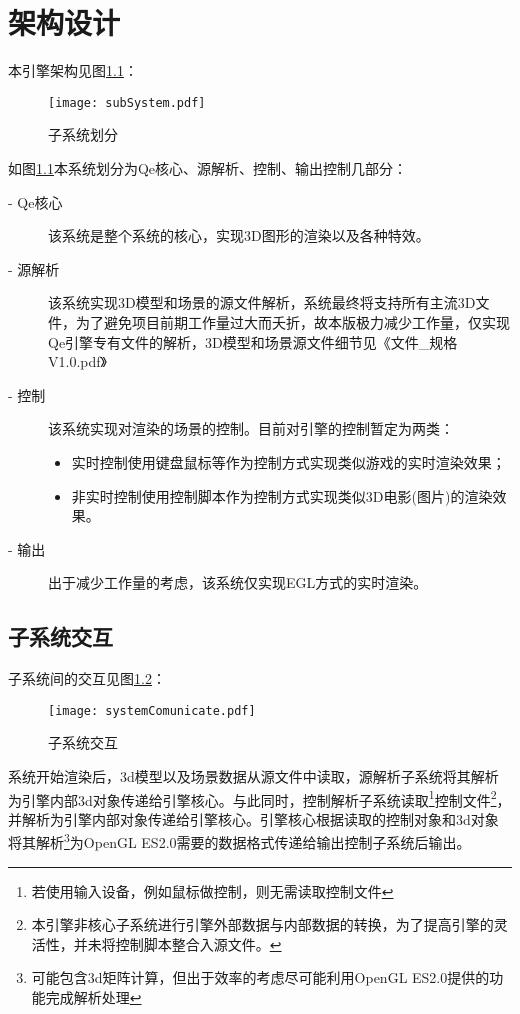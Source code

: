 \documentclass[12pt,a4paper]{report}
\begin{document}
\chapter{架构设计}
本引擎架构见图\ref{子系统划分}：

\begin{figure}[!hbp]
\begin{center}
\texttt{[image: subSystem.pdf]}
\end{center}
\caption{子系统划分\label{子系统划分}}
\end{figure}

如图\ref{子系统划分}本系统划分为Qe核心、源解析、控制、输出控制几部分：
\begin{description}
	\item[- Qe核心] 该系统是整个系统的核心，实现3D图形的渲染以及各种特效。
	\item[- 源解析] 该系统实现3D模型和场景的源文件解析，系统最终将支持所有主流3D文件，为了避免项目前期工作量过大而夭折，故本版极力减少工作量，仅实现Qe引擎专有文件的解析，3D模型和场景源文件细节见《文件\_规格V1.0.pdf》
	\item[- 控制] 该系统实现对渲染的场景的控制。目前对引擎的控制暂定为两类： 
		\begin{itemize}
			\item 实时控制使用键盘鼠标等作为控制方式实现类似游戏的实时渲染效果；
			\item 非实时控制使用控制脚本作为控制方式实现类似3D电影(图片)的渲染效果。
                \end{itemize}
	\item[- 输出] 出于减少工作量的考虑，该系统仅实现EGL方式的实时渲染。
\end{description}

\section{子系统交互}
子系统间的交互见图\ref{系统交互}：

\begin{figure}[!hbp]
\begin{center}
\texttt{[image: systemComunicate.pdf]}
\end{center}
\caption{子系统交互\label{系统交互}}
\end{figure}

系统开始渲染后，3d模型以及场景数据从源文件中读取，源解析子系统将其解析为引擎内部3d对象传递给引擎核心。与此同时，控制解析子系统读取\footnote{若使用输入设备，例如鼠标做控制，则无需读取控制文件}控制文件\footnote{本引擎非核心子系统进行引擎外部数据与内部数据的转换，为了提高引擎的灵活性，并未将控制脚本整合入源文件。}，并解析为引擎内部对象传递给引擎核心。引擎核心根据读取的控制对象和3d对象将其解析\footnote{可能包含3d矩阵计算，但出于效率的考虑尽可能利用OpenGL ES2.0提供的功能完成解析处理}为OpenGL ES2.0需要的数据格式传递给输出控制子系统后输出。
\end{document}
